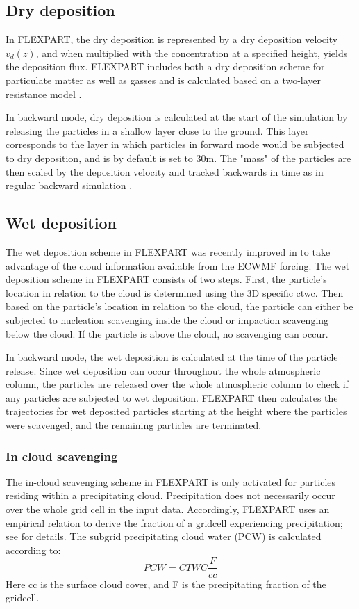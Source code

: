 \subsection{Dry deposition}
In FLEXPART, the dry deposition is represented by a dry deposition velocity $v_d(z)$, and when multiplied with the concentration at a specified height, yields the deposition flux. 
FLEXPART includes both a dry deposition scheme for particulate matter as well as gasses and is calculated based on a two-layer resistance model \parencite{Flexpart-2005_ref_paper}.

In backward mode, dry deposition is calculated at the start of the simulation by releasing the particles in a shallow layer close to the ground. This layer corresponds to the layer in which particles in forward mode would be subjected to dry deposition, and is by default is set to 30m. The "mass" of the particles are then scaled by the deposition velocity and tracked backwards in time as in regular backward simulation \parencite{eckhardt2017source}. 

\subsection{Wet deposition}
The wet deposition scheme in FLEXPART was recently improved in \textcite{flexpart_wetdep} to take advantage of the cloud information available from the ECWMF forcing. The wet deposition scheme in FLEXPART consists of two steps.
First, the particle's location in relation to the cloud is determined using the 3D specific \acrfull{ctwc}. Then based on the particle's location in relation to the cloud, the particle can either be subjected to nucleation scavenging inside the cloud or impaction scavenging below the cloud. If the particle is above the cloud, no scavenging can occur. 

In backward mode, the wet deposition is calculated at the time of the particle release. Since wet deposition can occur throughout the whole atmospheric column, the particles are released over the whole atmospheric column to check if any particles are subjected to wet deposition. FLEXPART then calculates the trajectories for wet deposited particles starting at the height where the particles were scavenged, and the remaining particles are terminated.    
\subsubsection{In cloud scavenging}
The in-cloud scavenging scheme in FLEXPART is only activated for particles residing within a precipitating cloud. Precipitation does not necessarily occur over the whole grid cell in the input data. Accordingly, FLEXPART uses an empirical relation to derive the fraction of a gridcell experiencing precipitation; see \textcite{Flexpart-2005_ref_paper} for details. The subgrid precipitating cloud water (PCW) is calculated according to: 
\begin{equation}
    PCW = CTWC\frac{F}{cc}
\end{equation}
Here cc is the surface cloud cover, and F is the precipitating fraction of the gridcell. 

